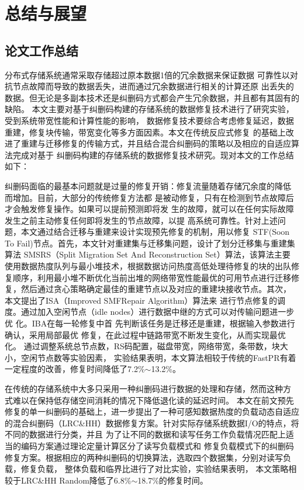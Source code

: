 \chapter{总结与展望}
\section{论文工作总结}

分布式存储系统通常采取存储超过原本数据1倍的冗余数据来保证数据
可靠性以对抗节点故障而导致的数据丢失，进而通过冗余数据进行相关的计算还原
出丢失的数据。但无论是多副本技术还是纠删码方式都会产生冗余数据，并且都有其固有的缺陷。
本文主要对基于纠删码构建的存储系统的数据修复技术进行了研究实验，受到系统带宽性能和计算性能的影响，
数据修复技术要综合考虑修复延迟，数据重建，修复块传输，带宽变化等多方面因素。本文在传统反应式修复
的基础上改进了重建与迁移修复的传输方式，并且结合混合纠删码的策略以及相应的自适应算法完成对基于
纠删码构建的存储系统的数据修复技术研究。现对本文的工作总结如下：

纠删码面临的最基本问题就是过量的修复开销：修复流量随着存储冗余度的降低
而增加。目前，大部分的传统修复方法都
是被动修复，只有在检测到节点故障后才会触发修复操作。如果可以提前预测即将发
生的故障，就可以在任何实际故障发生之前主动修复任何即将发生的节点故障，以提
高系统可靠性。针对上述问题，本文通过结合迁移与重建来设计实现预先修复的机制，用以修复 STF(Soon To
Fail)节点。首先，本文针对重建集与迁移集问题，设计了划分迁移集与重建集算法
SMSRS（Split Migration Set And Reconstruction Set）算法，该算法主要
使用数据热度队列与最小堆技术，根据数据访问热度高低处理待修复的块的出队修
复顺序，利用最小堆不断优化当前出堆的网络带宽性能最优的可用节点进行迁移修
复，然后通过贪心策略确定最佳的重建节点以及对应的重建块接收节点。其次，
本文提出了ISA（Improved SMFRepair Algorithm）算法来
进行节点修复的调度。通过加入空闲节点（idle nodes）进行数据中继的方式可以对传输问题进一步优
化。IBA在每一轮修复中首
先判断该任务是迁移还是重建，根据输入参数进行确认，采用局部最优
修复，在此过程中链路带宽不断发生变化，从而实现最优化。
通过调整系统总节点数，RS码配置，磁盘带宽，网络带宽，条带数，块大小，空闲节点数等实验因素，
实验结果表明，本文算法相较于传统的FastPR有着一定程度的改善，修复时间降低了7.2\%$\sim$13.2\%。

在传统的存储系统中大多只采用一种纠删码进行数据的处理和存储，然而这种方
式难以在保持低存储空间消耗的情况下降低退化读的延迟时间。
本文在前文预先修复的单一纠删码的基础上，进一步提出了一种可感知数据热度的负载动态自适应
的混合纠删码（LRC\&HH）数据修复方案。针对实际存储系统数据I/O的特点，将不同的数据进行分类，并且
为了让不同的数据和读写任务工作负载情况匹配上适当的编码方案通过理论定量计算区分了读写负载模式和
修复负载模式下的纠删码修复方案。根据相应的两种纠删码的切换算法，选取四个数据集，分别对读写负载，修复负载，
整体负载和临界比进行了对比实验，实验结果表明，
本文策略相较于LRC\&HH Random降低了6.8\%$\sim$18.7\%的修复时间。

